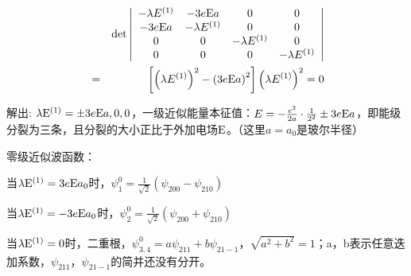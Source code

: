 \begin{eqnarray*}
{} &{}& \det \left| {\begin{array}{*{20}c}
   { - \lambda E^{(1)} } & { - 3e{\rm E}a} & 0 & 0  \\
   { - 3e{\rm E}a} & { - \lambda E^{(1)} } & 0 & 0  \\
   0 & 0 & { - \lambda E^{(1)} } & 0  \\
   0 & 0 & 0 & { - \lambda E^{(1)} }  \\
\end{array}} \right|  \\
{} &=& \left[ {\left( {\lambda E^{(1)} } \right)^2  - \left( {3e{\rm E}a} \right)^2 } \right] \left( {\lambda E^{(1)} } \right)^2  = 0
\end{eqnarray*}



解出: $\lambda {\rm E}^{(1)}  =  \pm 3e{\rm
E}a,0,0$，一级近似能量本征值：$E =  - \frac{{e^2 }}{{2a}} \cdot
\frac{1}{{2^2 }} \pm 3e{\rm
E}a$，即能级分裂为三条，且分裂的大小正比于外加电场${\rm
E}$。（这里$a = a_0$是玻尔半径）


零级近似波函数：


当$\lambda {\rm E}^{(1)}  = 3e{\rm E}a_0 $时，$\psi _1^0  = \frac{1}{{\sqrt 2 }}\left( {\psi _{200}  - \psi _{210} } \right)$

当$\lambda {\rm E}^{(1)}  =  - 3e{\rm E}a_0 $时，$\psi _2^0  = \frac{1}{{\sqrt 2 }}\left( {\psi _{200}  + \psi _{210} } \right)$

当$\lambda {\rm E}^{(1)}  = 0$时，二重根，$\psi _{3,4}^0  = a\psi _{211}  + b\psi _{21 - 1} $，$\sqrt {a^2  + b^2 }  = 1$；a，b表示任意迭加系数，$\psi _{211} $，$\psi _{21-1}$的简并还没有分开。
